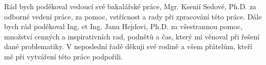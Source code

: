 Rád bych poděkoval vedoucí své bakalářské práce, Mgr. Ksenii Sedové, Ph.D. za
odborné vedení práce, za pomoc, vstřícnost a rady při zpracování této práce.
Dále bych rád poděkoval Ing. et Ing. Janu Hejdovi, Ph.D. za všestrannou pomoc,
množství cenných a inspirativních rad, podnětů a čas, který mi věnoval při
řešení dané problematiky. V neposlední řadě děkuji své rodině a všem přátelům,
kteří mě při vytváření této práce podpořili.